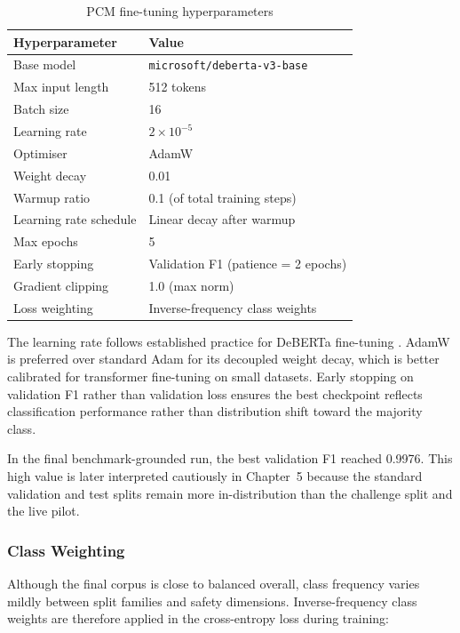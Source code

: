 \documentclass[12pt,a4paper]{article}
\begin{document}
\begin{table}[h]
\centering\small
\caption{PCM fine-tuning hyperparameters}\label{tab:hyperparams}
\begin{tabular}{@{} l l @{}}
\toprule
\textbf{Hyperparameter} & \textbf{Value} \\
\midrule
Base model        & \texttt{microsoft/deberta-v3-base} \\
Max input length  & 512 tokens \\
Batch size        & 16 \\
Learning rate     & $2 \times 10^{-5}$ \\
Optimiser         & AdamW \citep{loshchilov2019adamw} \\
Weight decay      & 0.01 \\
Warmup ratio      & 0.1 (of total training steps) \\
Learning rate schedule & Linear decay after warmup \\
Max epochs        & 5 \\
Early stopping    & Validation F1 (patience = 2 epochs) \\
Gradient clipping & 1.0 (max norm) \\
Loss weighting    & Inverse-frequency class weights \\
\bottomrule
\end{tabular}
\end{table}

The learning rate follows established practice for DeBERTa fine-tuning
\citep{he2023debertav3,liu2019roberta}. AdamW \citep{loshchilov2019adamw} is
preferred over standard Adam for its decoupled weight decay, which is better
calibrated for transformer fine-tuning on small datasets. Early stopping on
validation F1 rather than validation loss ensures the best checkpoint reflects
classification performance rather than distribution shift toward the majority
class.

In the final benchmark-grounded run, the best validation F1 reached 0.9976.
This high value is later interpreted cautiously in Chapter~5 because the
standard validation and test splits remain more in-distribution than the
challenge split and the live pilot.

\subsubsection{Class Weighting}

Although the final corpus is close to balanced overall, class frequency varies
mildly between split families and safety dimensions. Inverse-frequency class
weights are therefore applied in the cross-entropy loss during training:
\end{document}
